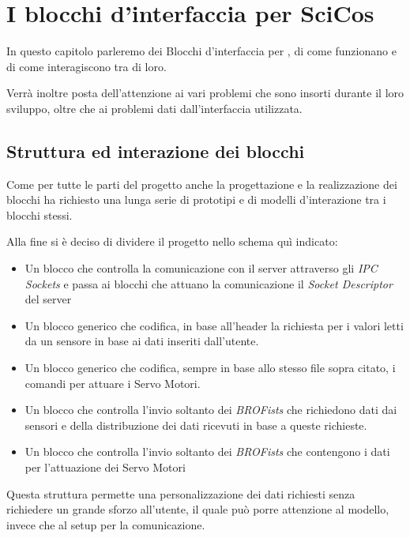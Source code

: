 \chapter{I blocchi d'interfaccia per SciCos}
\label{chap:SCICOSB}

In questo capitolo parleremo dei Blocchi d'interfaccia per \SciCos{}, di
come funzionano e di come interagiscono tra di loro.

Verrà inoltre posta dell'attenzione ai vari problemi che sono insorti
durante il loro sviluppo, oltre che ai problemi dati dall'interfaccia
utilizzata.

\section{Struttura ed interazione dei blocchi}
Come per tutte le parti del progetto anche la progettazione e la
realizzazione dei blocchi ha richiesto una lunga serie di prototipi e di
modelli d'interazione tra i blocchi stessi.

Alla fine si è deciso di dividere il progetto nello schema quì indicato:
\begin{itemize}
    \item Un blocco che controlla la comunicazione con il server attraverso
        gli \emph{IPC Sockets} e passa ai blocchi che attuano la
        comunicazione il \emph{Socket Descriptor} del server
    \item Un blocco generico che codifica, in base all'header
         la richiesta per i valori letti da un sensore
        in base ai dati inseriti dall'utente.
    \item Un blocco generico che codifica, sempre in base allo stesso file
        sopra citato, i comandi per attuare i Servo Motori.
    \item Un blocco che controlla l'invio soltanto dei \emph{BROFists} che
        richiedono dati dai sensori e della distribuzione dei dati ricevuti
        in base a queste richieste.
    \item Un blocco che controlla l'invio soltanto dei \emph{BROFists} che
        contengono i dati per l'attuazione dei Servo Motori
\end{itemize}

Questa struttura permette una personalizzazione dei dati richiesti senza
richiedere un grande sforzo all'utente, il quale può porre attenzione al
modello, invece che al setup per la comunicazione.

